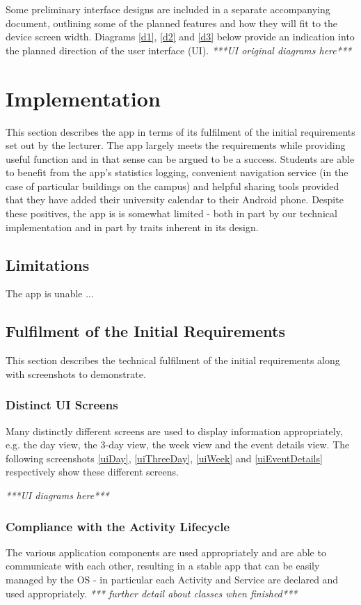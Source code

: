 \documentclass{article}
\begin{document}
Some preliminary interface designs are included in a separate accompanying document, outlining some of the planned features and how they will fit to the device screen width. Diagrams \ref{d1}, \ref{d2} and \ref{d3} below provide an indication into the planned direction of the user interface (UI).
\newline
\noindent\emph{***UI original diagrams here***}

\section{Implementation}
This section describes the app in terms of its fulfilment of the initial requirements set out by the lecturer. The app largely meets the requirements while providing useful function and in that sense can be argued to be a success. Students are able to benefit from the app's statistics logging, convenient navigation service (in the case of particular buildings on the campus) and helpful sharing tools provided that they have added their university calendar to their Android phone. Despite these positives, the app is is somewhat limited - both in part by our technical implementation and in part by traits inherent in its design. 

\subsection{Limitations}
The app is unable  ...

\subsection{Fulfilment of the Initial Requirements}
This section describes the technical fulfilment of the initial requirements along with screenshots to demonstrate.

\subsubsection{Distinct UI Screens}
Many distinctly different screens are used to display information appropriately, e.g. the day view, the 3-day view, the week view and the event details view. The following screenshots \ref{uiDay}, \ref{uiThreeDay}, \ref{uiWeek} and \ref{uiEventDetails} respectively show these different screens.

\emph{***UI diagrams here***}

\subsubsection{Compliance with the Activity Lifecycle}
The various application components are used appropriately and are able to communicate with each other, resulting in a stable app that can be easily managed by the OS - in particular each Activity and Service are declared and used appropriately. \emph{*** further detail about classes when finished*** }
\end{document}
